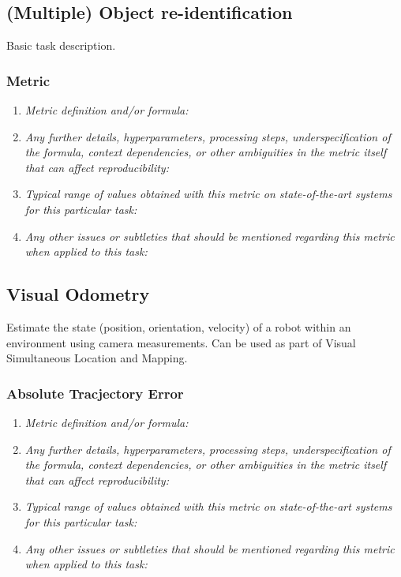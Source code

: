 \documentclass[a4paper,11pt]{article}
\begin{document}
    \subsection{(Multiple) Object re-identification}
        Basic task description.
        \subsubsection{Metric}
            \begin{enumerate}[label=\alph*.]
                \item \textit{Metric definition and/or formula:}
                \bigskip
                \item \textit{Any further details, hyperparameters, processing steps, underspecification of the formula, context dependencies, or other ambiguities in the metric itself that can affect reproducibility:}
                \bigskip
                \item \textit{Typical range of values obtained with this metric on state-of-the-art systems for this particular task:}
                \bigskip
                \item \textit{Any other issues or subtleties that should be mentioned regarding this metric when applied to this task:}
                \bigskip
            \end{enumerate}

    \subsection{Visual Odometry}
        Estimate the state (position, orientation, velocity) of a robot within an environment using camera measurements. Can be used as part of Visual Simultaneous Location and Mapping.
        \subsubsection{Absolute Tracjectory Error}
            \begin{enumerate}[label=\alph*.]
                \item \textit{Metric definition and/or formula:}
                \bigskip
                \item \textit{Any further details, hyperparameters, processing steps, underspecification of the formula, context dependencies, or other ambiguities in the metric itself that can affect reproducibility:}
                \bigskip
                \item \textit{Typical range of values obtained with this metric on state-of-the-art systems for this particular task:}
                \bigskip
                \item \textit{Any other issues or subtleties that should be mentioned regarding this metric when applied to this task:}
                \bigskip
            \end{enumerate}
\end{document}
